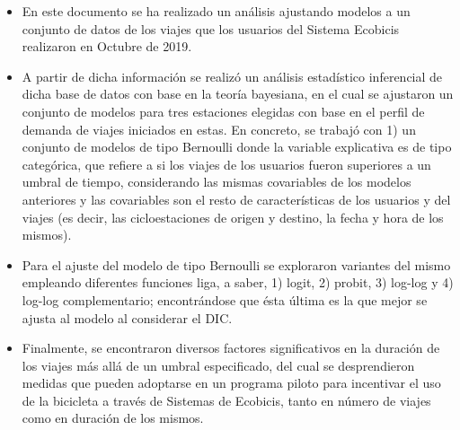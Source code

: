 \documentclass[9pt,twocolumn,twoside]{ilcss}
\begin{document}
\begin{itemize}
    \item En este documento se ha realizado un análisis ajustando modelos a un conjunto de datos de los viajes que los usuarios del Sistema Ecobicis realizaron en Octubre de 2019.
    \item  A partir de dicha información se realizó un análisis estadístico inferencial de dicha base de datos con base en la teoría bayesiana, en el cual se ajustaron un conjunto de modelos para tres estaciones elegidas con base en el perfil de demanda de viajes iniciados en estas. En concreto, se trabajó con 1) un conjunto de modelos de tipo Bernoulli donde la variable explicativa es de tipo categórica, que refiere a si los viajes de los usuarios fueron superiores a un umbral de tiempo, considerando las mismas covariables de los modelos anteriores y las covariables son el resto de características de los usuarios y del viajes (es decir, las cicloestaciones de origen y destino, la fecha y hora de los mismos).
    \item Para el ajuste del modelo de tipo Bernoulli se exploraron variantes del mismo empleando diferentes funciones liga, a saber, 1) logit, 2) probit, 3) log-log y 4) log-log complementario; encontrándose que ésta última es la que mejor se ajusta al modelo al considerar el DIC.
    \item Finalmente, se encontraron diversos factores significativos en la duración de los viajes más allá de un umbral especificado, del cual se desprendieron medidas que pueden adoptarse en un programa piloto para incentivar el uso de la bicicleta a través de Sistemas de Ecobicis, tanto en número de viajes como en duración de los mismos.
\end{itemize}


\end{document}
